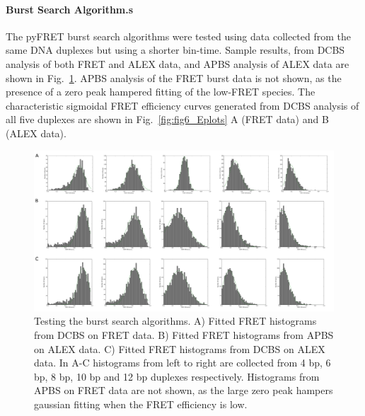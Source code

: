 \paragraph{Burst Search Algorithm.s}
The pyFRET burst search algorithms were tested using data collected from the same DNA duplexes but using a shorter bin-time. Sample results, from DCBS analysis of both FRET and ALEX data, and APBS analysis of ALEX data are shown in Fig.~\ref{fig:burst_search}. APBS analysis of the FRET burst data is not shown, as the presence of a zero peak hampered fitting of the low-FRET species. The characteristic sigmoidal FRET efficiency curves generated from DCBS analysis of all five duplexes are shown in Fig.~\ref{fig:fig6_Eplots} A (FRET data) and B (ALEX data).

\begin{landscape}
\begin{figure}[!ht]
   \begin{center}
      \includegraphics*[clip=true, width=9in]{pyFRET/burst_search.pdf}
      \caption{Testing the burst search algorithms. A) Fitted FRET histograms from DCBS on FRET data. B) Fitted FRET histograms from APBS on ALEX data. C) Fitted FRET histograms from DCBS on ALEX data. In A-C histograms from left to right are collected from 4 bp, 6 bp, 8 bp, 10 bp and 12 bp duplexes respectively. Histograms from APBS on FRET data are not shown, as the large zero peak hampers gaussian fitting when the FRET efficiency is low.}
      \label{fig:burst_search}
   \end{center}
\end{figure}
\end{landscape}

